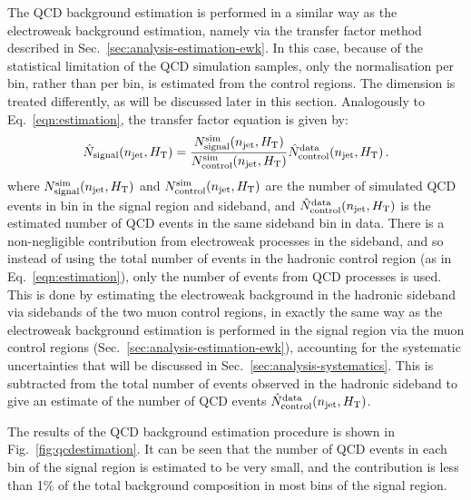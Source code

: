 The QCD background estimation is performed in a similar way as the 
electroweak background estimation, namely via the transfer factor method 
described in Sec.~\ref{sec:analysis-estimation-ewk}. In this case, because of 
the statistical limitation of the QCD simulation samples, only the 
normalisation per \njht bin, rather than per \njnbht bin, is estimated from the 
control regions. The \nbmht dimension is treated differently, as will be 
discussed later in this section. Analogously to Eq.~\ref{eqn:estimation}, the 
transfer factor equation is given by:
\begin{equation}
\hat{N}_\mathrm{signal}(n_{\text{jet}}, \mbox{$H_\text{T}$}) = 
\frac{N_\mathrm{signal}^\mathrm{sim}(n_{\text{jet}}, \mbox{$H_\text{T}$})}{N_\mathrm{control}^\mathrm{sim}(n_{\text{jet}}, \mbox{$H_\text{T}$})}
\hat{N}_\mathrm{control}^\mathrm{data}(n_{\text{jet}}, \mbox{$H_\text{T}$}) \, .
\end{equation}
where $N_\mathrm{signal}^\mathrm{sim}(n_{\text{jet}}, \mbox{$H_\text{T}$})$ and 
$N_\mathrm{control}^\mathrm{sim}(n_{\text{jet}}, \mbox{$H_\text{T}$})$ are the number of simulated QCD events 
in bin \njht in the signal 
region and sideband, and $\hat{N}_\mathrm{control}^\mathrm{data}(n_{\text{jet}}, \mbox{$H_\text{T}$})$ is the 
estimated number of QCD events in the same 
sideband bin in data. There is a non-negligible contribution from electroweak 
processes in the sideband, and so instead of using the total number of events 
in the hadronic control region (as in Eq.~\ref{eqn:estimation}), only the 
number of events from QCD processes is used. This is done by estimating the 
electroweak background in the hadronic sideband via sidebands of the two muon 
control regions, in exactly the same way as the electroweak background 
estimation is performed in the signal region via the muon control regions 
(Sec.~\ref{sec:analysis-estimation-ewk}), accounting for the systematic 
uncertainties that will be discussed in Sec.~\ref{sec:analysis-systematics}. 
This is subtracted from the total 
number of events observed in the hadronic sideband to give an estimate of the 
number of QCD events $\hat{N}_\mathrm{control}^\mathrm{data}(n_{\text{jet}}, \mbox{$H_\text{T}$})$.

The results of the QCD background estimation procedure is shown in 
Fig.~\ref{fig:qcdestimation}. It can be seen that the number of QCD events in 
each \njht bin of the signal region is estimated to be very small, and the 
contribution is less than 1\% of the total background composition in most bins 
of the signal region.

